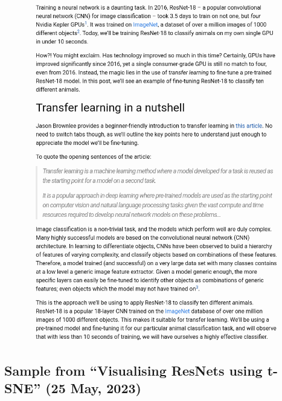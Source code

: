 \begin{figure}[!ht]
    \centering
    \includegraphics[width=\textwidth]{images/q1_sample_of_post_3.png}
\end{figure}

\newpage

\subsection*{Sample from ``Visualising ResNets using t-SNE'' (25 May, 2023)}

